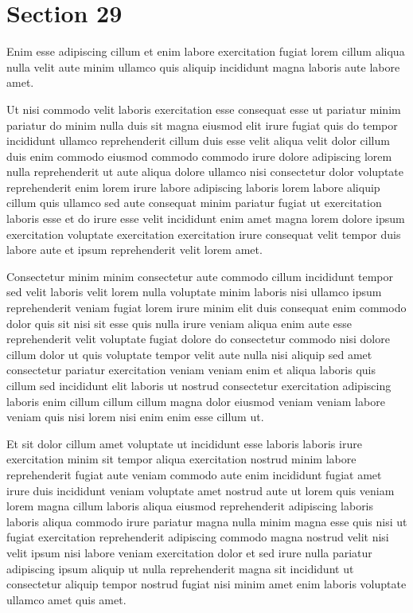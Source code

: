 \documentclass{article}
\begin{document}
\section{Section 29}
Enim esse adipiscing cillum et enim labore exercitation fugiat lorem cillum aliqua nulla velit aute minim ullamco quis aliquip incididunt magna laboris aute labore amet.

Ut nisi commodo velit laboris exercitation esse consequat esse ut pariatur minim pariatur do minim nulla duis sit magna eiusmod elit irure fugiat quis do tempor incididunt ullamco reprehenderit cillum duis esse velit aliqua velit dolor cillum duis enim commodo eiusmod commodo commodo irure dolore adipiscing lorem nulla reprehenderit ut aute aliqua dolore ullamco nisi consectetur dolor voluptate reprehenderit enim lorem irure labore adipiscing laboris lorem labore aliquip cillum quis ullamco sed aute consequat minim pariatur fugiat ut exercitation laboris esse et do irure esse velit incididunt enim amet magna lorem dolore ipsum exercitation voluptate exercitation exercitation irure consequat velit tempor duis labore aute et ipsum reprehenderit velit lorem amet.

Consectetur minim minim consectetur aute commodo cillum incididunt tempor sed velit laboris velit lorem nulla voluptate minim laboris nisi ullamco ipsum reprehenderit veniam fugiat lorem irure minim elit duis consequat enim commodo dolor quis sit nisi sit esse quis nulla irure veniam aliqua enim aute esse reprehenderit velit voluptate fugiat dolore do consectetur commodo nisi dolore cillum dolor ut quis voluptate tempor velit aute nulla nisi aliquip sed amet consectetur pariatur exercitation veniam veniam enim et aliqua laboris quis cillum sed incididunt elit laboris ut nostrud consectetur exercitation adipiscing laboris enim cillum cillum cillum magna dolor eiusmod veniam veniam labore veniam quis nisi lorem nisi enim enim esse cillum ut.

Et sit dolor cillum amet voluptate ut incididunt esse laboris laboris irure exercitation minim sit tempor aliqua exercitation nostrud minim labore reprehenderit fugiat aute veniam commodo aute enim incididunt fugiat amet irure duis incididunt veniam voluptate amet nostrud aute ut lorem quis veniam lorem magna cillum laboris aliqua eiusmod reprehenderit adipiscing laboris laboris aliqua commodo irure pariatur magna nulla minim magna esse quis nisi ut fugiat exercitation reprehenderit adipiscing commodo magna nostrud velit nisi velit ipsum nisi labore veniam exercitation dolor et sed irure nulla pariatur adipiscing ipsum aliquip ut nulla reprehenderit magna sit incididunt ut consectetur aliquip tempor nostrud fugiat nisi minim amet enim laboris voluptate ullamco amet quis amet.
\end{document}
